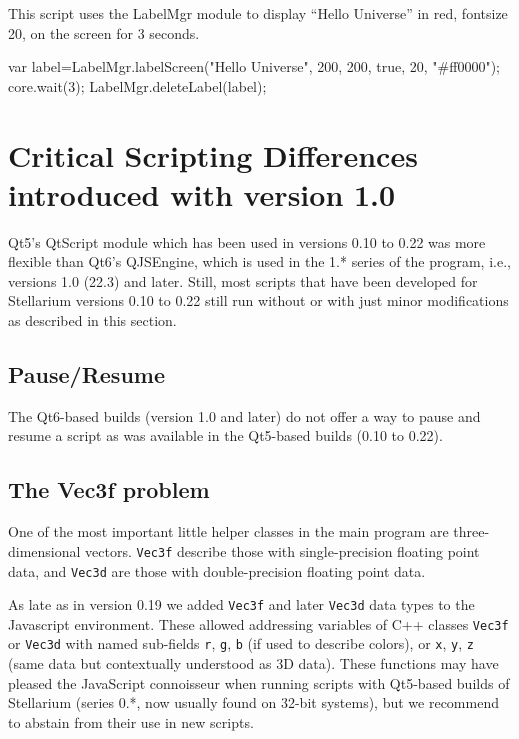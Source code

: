 \noindent This script uses the LabelMgr module to display ``Hello Universe'' in red, fontsize 20, on the screen for 3 seconds.
\begin{script}
var label=LabelMgr.labelScreen("Hello Universe", 200, 200, 
                               true, 20, "#ff0000");
core.wait(3);
LabelMgr.deleteLabel(label);
\end{script}

\section{Critical Scripting Differences introduced with version 1.0}
\label{sec:scripting:differences}

Qt5's QtScript module which has been used in versions 0.10 to 0.22 was more flexible than Qt6's QJSEngine, 
which is used in the 1.* series of the program, i.e., versions 1.0 (22.3) and later. 
Still, most scripts that have been developed for Stellarium versions 0.10 to 0.22 
still run without or with just minor modifications as described in this section. 

\subsection{Pause/Resume}
\label{sec:scripting:differences:pause}

The Qt6-based builds (version 1.0 and later) do not offer a way to pause and resume a script as was available in the Qt5-based builds (0.10 to 0.22). 

\subsection{The Vec3f problem}
\label{sec:scripting:differences:Vec3f}

One of the most important little helper classes in the main program are three-dimensional vectors. 
\texttt{Vec3f} describe those with single-precision floating point data, 
and \texttt{Vec3d} are those with double-precision floating point data.

As late as in version 0.19 we added \texttt{Vec3f} and later \texttt{Vec3d} data types to the Javascript environment. 
These allowed addressing variables of C++ classes \texttt{Vec3f} or \texttt{Vec3d} with named sub-fields \texttt{r}, \texttt{g}, \texttt{b} 
(if used to describe colors), or \texttt{x}, \texttt{y}, \texttt{z} (same data but contextually understood as 3D data).
These functions may have pleased the JavaScript connoisseur when running scripts with Qt5-based builds of 
Stellarium (series 0.*, now usually found on 32-bit systems), but we recommend to abstain from their use in new scripts.

